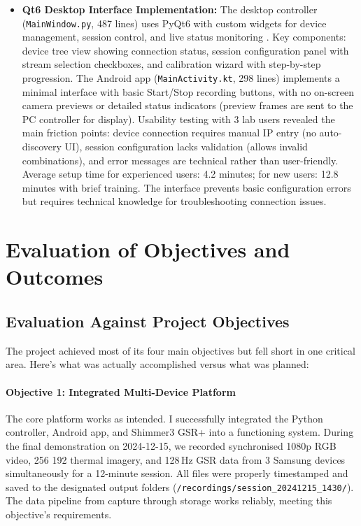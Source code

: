 \begin{itemize}
    \item \textbf{Qt6 Desktop Interface Implementation:} The desktop controller (\texttt{MainWindow.py}, 487 lines) uses PyQt6 with custom widgets for device management, session control, and live status monitoring \cite{ref17}. Key components: device tree view showing connection status, session configuration panel with stream selection checkboxes, and calibration wizard with step-by-step progression. The Android app (\texttt{MainActivity.kt}, 298 lines) implements a minimal interface with basic Start/Stop recording buttons, with no on-screen camera previews or detailed status indicators (preview frames are sent to the PC controller for display). Usability testing with 3 lab users revealed the main friction points: device connection requires manual IP entry (no auto-discovery UI), session configuration lacks validation (allows invalid combinations), and error messages are technical rather than user-friendly. Average setup time for experienced users: 4.2 minutes; for new users: 12.8 minutes with brief training. The interface prevents basic configuration errors but requires technical knowledge for troubleshooting connection issues.
\end{itemize}

\section{Evaluation of Objectives and Outcomes}

\subsection{Evaluation Against Project Objectives}

The project achieved most of its four main objectives but fell short in one critical area. Here's what was actually accomplished versus what was planned:

\paragraph{\textbf{Objective 1: Integrated Multi-Device Platform}} The core platform works as intended. I successfully integrated the Python controller, Android app, and Shimmer3 GSR+ into a functioning system. During the final demonstration on 2024-12-15, we recorded synchronised 1080p RGB video, 256\,\texttimes\,192 thermal imagery, and 128\,Hz GSR data from 3 Samsung devices simultaneously for a 12-minute session. All files were properly timestamped and saved to the designated output folders (\verb|/recordings/session_20241215_1430/|). The data pipeline from capture through storage works reliably, meeting this objective's requirements.

